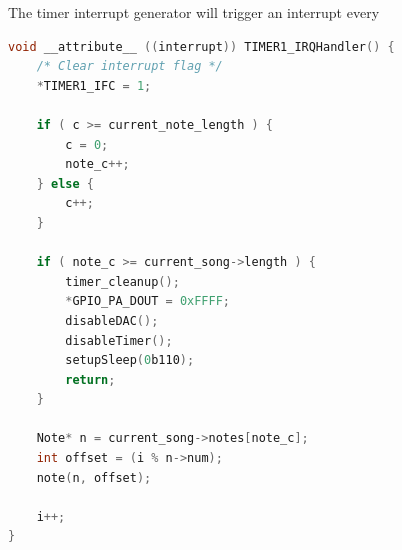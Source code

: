 The timer interrupt generator will trigger an interrupt every
\begin{minipage}{\linewidth}
\begin{lstlisting}[language=C, label=interrupt_handlers, caption=Timer interrupt handler from interrupt\_handlers.c]
void __attribute__ ((interrupt)) TIMER1_IRQHandler() {  
    /* Clear interrupt flag */
    *TIMER1_IFC = 1;

    if ( c >= current_note_length ) {
        c = 0;
        note_c++;
    } else {
        c++;
    }

    if ( note_c >= current_song->length ) {
        timer_cleanup();
        *GPIO_PA_DOUT = 0xFFFF;
        disableDAC();
        disableTimer();
        setupSleep(0b110);
        return;
    }

    Note* n = current_song->notes[note_c];
    int offset = (i % n->num);
    note(n, offset);

    i++;
}
\end{lstlisting}
\end{minipage}


